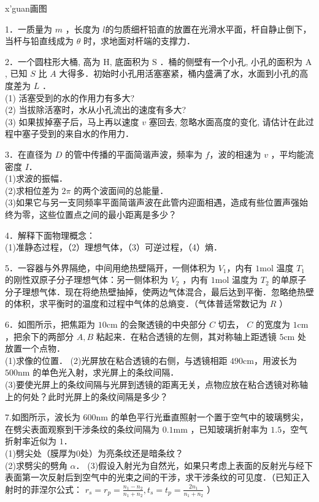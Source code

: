 
\begin{issues}
x'guan画图
\end{issues}

1．一质量为 $m$ ，长度为 $l$的匀质细杆铅直的放置在光滑水平面，杆自静止倒下，当杆与铅直线成为 $\theta$ 时，求地面对杆端的支撑力．

2．一个圆柱形大桶, 高为 $\mathrm{H}$, 底面积为 $\mathrm{S}$ ．桶的侧壁有一个小孔, 小孔的面积为 $\mathrm{A}$, 已知 $S$ 比 $A$ 大得多．初始时小孔用活塞塞紧，桶内盛满了水，水面到小孔的高度差为 $L$ ．\\
(1) 活塞受到的水的作用力有多大? \\
(2) 当拔除活塞时，水从小孔流出的速度有多大? \\
(3) 如果拔掉塞子后，马上再以速度 $v$ 塞回去, 忽略水面高度的变化, 请估计在此过程中塞子受到的来自水的作用力．

3．在直径为 $D$ 的管中传播的平面简谐声波，频率为 $f$，波的相速为 $v$ ，平均能流密度 $I$．\\
(1)求波的振幅．\\
(2)求相位差为 $2\pi$ 的两个波面间的总能量．\\
(3)如果它与另一支同频率平面简谐声波在此管内迎面相遇，造成有些位置声强始终为零，这些位置点之间的最小距离是多少？

4．解释下面物理概念：\\
(1)准静态过程，（2）理想气体，（3）可逆过程，（4）熵．

5．一容器与外界隔绝，中间用绝热壁隔开，一侧体积为 $V_1$，内有 $1\mathrm{mol}$ 温度 $T_1$ 的刚性双原子分子理想气体：另一侧体积为 $V_2$ ，内有 $1\mathrm{mol}$ 温度为 $T_2$ 的单原子分子理想气体．现在将绝热壁抽掉，使两边气体混合，最后达到平衡．忽略绝热壁的体积，求平衡时的温度和过程中气体的总熵变．（气体普适常数记为 $R$ ）

6．如图所示，把焦距为 $10\mathrm{cm}$ 的会聚透镜的中央部分 $C$ 切去， $C$ 的宽度为 $1\mathrm{cm}$ ，把余下的两部分 $A,B$ 粘起来．在粘合透镜的左侧，其对称轴上距透镜 $5\mathrm{cm}$ 处放置一个点物．\\
(1)求像的位置．
(2)光屏放在粘合透镜的右侧，与透镜相距 $490\mathrm{cm}$，用波长为 $500\mathrm{nm}$ 的单色光入射，求光屏上的条纹间隔．\\
(3)要使光屏上的条纹间隔与光屏到透镜的距离无关，点物应放在粘合透镜对称轴上的何处？此时光屏上的条纹间隔是多少？

7.如图所示，波长为 $600\mathrm{nm}$ 的单色平行光垂直照射一个置于空气中的玻璃劈尖，在劈尖表面观察到干涉条纹的条纹间隔为 $0.1\mathrm{mm}$ ，已知玻璃折射率为 $1.5$，空气折射率近似为 $1$．\\
(1)劈尖处（膜厚为0处）为亮条纹还是暗条纹？\\
(2)求劈尖的劈角 $\alpha$．
(3)假设入射光为自然光，如果只考虑上表面的反射光与经下表面第一次反射后到空气中的光束之间的干涉，求干涉条纹的可见度．（已知正入射时的菲涅尔公式： $r_s=r_p=\frac{n_1-n_2}{n_1+n_2},t_s=t_p=\frac{2n_1}{n_1+n_2}$ ）

